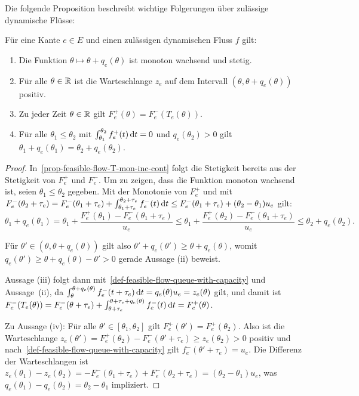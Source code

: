 Die folgende Proposition beschreibt wichtige Folgerungen über zulässige dynamische Flüsse:

\begin{proposition}\label{prop-feasible-flow}
	Für eine Kante $e\in E$ und einen zulässigen dynamischen Fluss $f$ gilt:
	\begin{enumerate}[label=(\roman*)]
		\item\label{prop-feasible-flow-T-mon-inc-cont} Die Funktion $\theta \mapsto \theta + q_e(\theta)$ ist monoton wachsend und stetig.
		\item\label{prop-feasible-flow-positive-queue} Für alle $\theta\in\mathbb{R}$ ist die Warteschlange $z_e$ auf dem Intervall $(\theta, \theta + q_e(\theta))$ positiv.
		\item\label{prop-feasible-flow-det-outflow} Zu jeder Zeit $\theta\in\mathbb{R}$ gilt $F_e^+(\theta) = F_e^-(T_e(\theta))$.
		\item\label{prop-feasible-flow-queue-delay} Für alle $\theta_1 \leq \theta_2$ mit $\int_{\theta_1}^{\theta_2} f^+_e(t) \mathop{}\!\mathrm{d} t = 0$ und $q_e(\theta_2)>0$ gilt $\theta_1 + q_e(\theta_1) = \theta_2 + q_e(\theta_2)$.
	\end{enumerate}
\end{proposition}
\begin{proof}
	In~\ref{prop-feasible-flow-T-mon-inc-cont} folgt die Stetigkeit bereits aus der Stetigkeit von $F_e^+$ und $F_e^-$.
	Um zu zeigen, dass die Funktion monoton wachsend ist, seien $\theta_1 \leq \theta_2$ gegeben.
	Mit der Monotonie von $F_e^+$ und mit $F_e^-(\theta_2 + \tau_e) = F_e^-(\theta_1+\tau_e) + \int_{\theta_1+\tau_e}^{\theta_2+\tau_e} f_e^-(t)\mathop{}\!\mathrm{d} t\leq F_e^-(\theta_1 + \tau_e) + (\theta_2 - \theta_1)u_e$ gilt: 
	\[
		\theta_1 + q_e(\theta_1)
		= \theta_1 + \frac{F_e^+(\theta_1) - F_e^-(\theta_1 + \tau_e)}{u_e}
		\leq \theta_1 + \frac{F_e^+(\theta_2) - F_e^-(\theta_1+\tau_e)}{u_e} \leq \theta_2 + q_e(\theta_2).
	\]
	
	Für $\theta'\in (\theta, \theta+q_e(\theta))$ gilt also $\theta' + q_e(\theta') \geq \theta + q_e(\theta)$, womit $q_e(\theta') \geq \theta + q_e(\theta) - \theta' > 0$ gerade Aussage (ii) beweist.
	
	Aussage (iii) folgt dann mit~\ref{def-feasible-flow-queue-with-capacity} und Aussage~(ii), da
	$\int_{\theta}^{\theta + q_e(\theta)}f_e^-(t + \tau_e) \mathop{}\!\mathrm{d} t = q_e(\theta)  u_e = z_e(\theta)$ gilt, und damit ist $F_e^-(T_e(\theta)) = F_e^-(\theta+\tau_e) + \int_{\theta+\tau_e}^{\theta+\tau_e+q_e(\theta)}f_e^-(t)\mathop{}\!\mathrm{d} t = F_e^+(\theta)$.
	
	Zu Aussage (iv):
	Für alle $\theta'\in [\theta_1, \theta_2]$ gilt $F_e^+(\theta') = F_e^+(\theta_2)$.
	Also ist die Warteschlange $z_e(\theta') = F_e^+(\theta_2) - F_e^-(\theta' + \tau_e) \geq z_e(\theta_2) > 0$ positiv und nach~\ref{def-feasible-flow-queue-with-capacity} gilt $f_e^-(\theta' + \tau_e)=u_e$.
	Die Differenz der Warteschlangen ist
	$z_e(\theta_1)-z_e(\theta_2)=-F^-_e(\theta_1 + \tau_e) + F^-_e(\theta_2 + \tau_e) = (\theta_2 - \theta_1)u_e$, was $q_e(\theta_1) - q_e(\theta_2) = \theta_2 - \theta_1$ impliziert.
\end{proof}